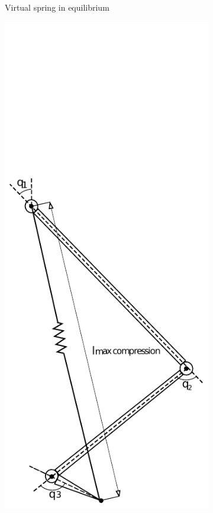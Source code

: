 \begin{figure}[ht!]
\begin{subfigure}[b]{0.25\textwidth}
        \caption{Virtual spring in equilibrium}
        \label{fig:virtual_spring1}
    \end{subfigure}
    \begin{subfigure}[b]{0.25\textwidth}
        \includegraphics[width=\textwidth]{figures/spring_model_max_compressed.pdf}

\end{subfigure}
\end{figure}
